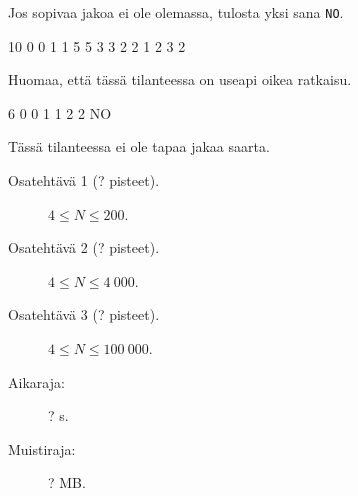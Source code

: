 \documentclass{boi2014-fi}
\newcommand{\constant}[1]{{\tt #1}}
\begin{document}
    Jos sopivaa jakoa ei ole olemassa, tulosta yksi sana \constant{NO}.

    \clearpage

    \Examples
    \example
    {
        10  0  0  1  1  5  5  3  3  2  2
    }
    {
        1 2 3 2
    }
    {
        Huomaa, että tässä tilanteessa on useapi oikea ratkaisu.

        \begin{center}
        \end{center}
    }

    \example
    {
        6  0  0  1  1  2  2
    }
    {
        NO
    }
    {
        Tässä tilanteessa ei ole tapaa jakaa saarta.
        \begin{center}
        \end{center}
    }

    \Scoring

    \begin{description}
        \item[Osatehtävä 1 (? pisteet).] $4 \le N \le 200$.
        \item[Osatehtävä 2 (? pisteet).] $4 \le N \le 4\ 000$.
        \item[Osatehtävä 3 (? pisteet).] $4 \le N \le 100\ 000$.
    \end{description}

    \Constraints

    \begin{description}
        \item[Aikaraja:] ? s.
        \item[Muistiraja:] ? MB.
    \end{description}
\end{document}
